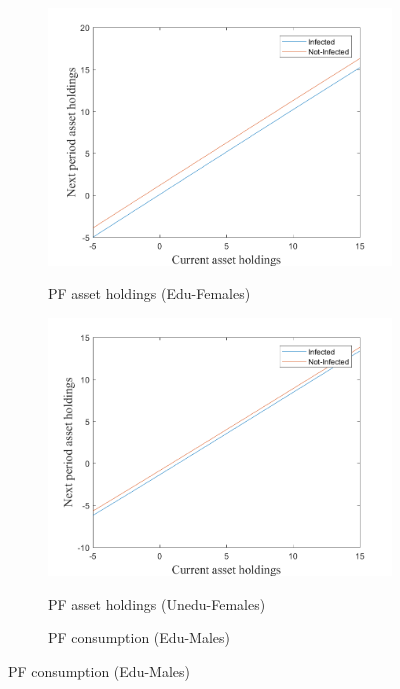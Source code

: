 \begin{figure}[H]
\bigskip
\begin{subfigure}{0.5\textwidth}\caption{PF asset holdings (Edu-Females)}
   \includegraphics[width=\linewidth,height = 0.22\textheight]{figures/mio/FIG3.png}
    \label{fig_dert}
\end{subfigure}
\hspace*{\fill}
\begin{subfigure}{0.5\textwidth}\caption{PF asset holdings (Unedu-Females)}
   \includegraphics[width=\linewidth,height = 0.22\textheight]{figures/mio/FIG4.png}
    \label{fig:x_b}
\end{subfigure}
\bigskip
\begin{subfigure}{0.5\textwidth}\caption{PF consumption (Edu-Males)}

\end{subfigure}
\end{figure}
